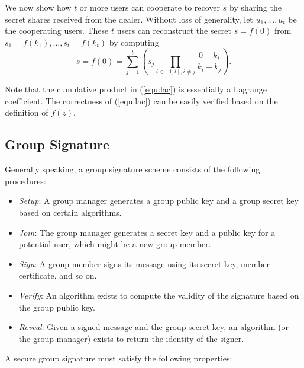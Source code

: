\documentclass[letterpaper,12pt]{article}
\begin{document}
We now show how $t$ or more users can cooperate to recover $s$ by sharing the secret shares received from the dealer. Without loss of generality, let $u_1, \ldots, u_t$ be the cooperating users. These $t$ users can reconstruct the secret $s = f(0)$ from $s_1 = f(k_1), \ldots, s_t = f(k_t)$ by computing
%
\begin{equation}
s = f(0)=\sum_{j=1}^t \left(s_j \prod_{i \in [1, t],i\neq j}\frac{0-k_{i}}{k_{i}-k_{j}} \right). \label{equ:lac}
\end{equation}

Note that the cumulative product in (\ref{equ:lac}) is essentially a Lagrange coefficient. The correctness of (\ref{equ:lac}) can be
easily verified based on the definition of $f(z)$.

\subsection {Group Signature} \label{sec: IBGS}
Generally speaking,  a group signature scheme \cite{chaum1991group} consists of the following procedures:

\begin{itemize}
\item \emph{Setup}:
A group manager generates a group public key and a group secret key based on certain algorithms.

\item \emph{Join}: The group manager generates a secret key and a public key for a potential user, which might be a new group member.

\item \emph{Sign}: A group member signs its message using its secret key, member certificate, and so on.

\item \emph{Verify}: An algorithm exists to compute the validity of the signature based on the group public key.

\item \emph{Reveal}: Given a signed message and the group secret key, an algorithm (or the group manager) exists to return the identity of the signer.
\end{itemize}

A secure group signature must satisfy the following properties:
\end{document}

